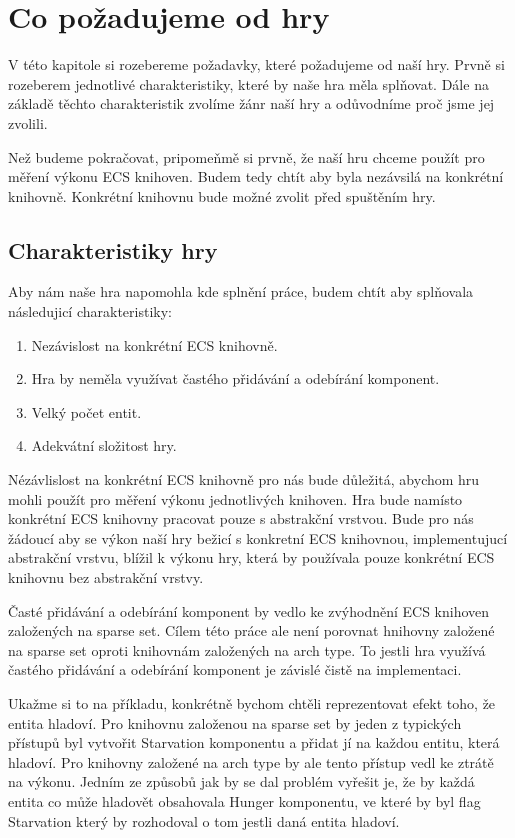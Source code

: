\chapter{Co požadujeme od hry}
V této kapitole si rozebereme požadavky, které požadujeme od naší hry. Prvně si rozeberem jednotlivé charakteristiky, které by naše hra měla splňovat. Dále na základě těchto charakteristik zvolíme žánr naší hry a odůvodníme proč jsme jej zvolili.

Než budeme pokračovat, pripomeňmě si prvně, že naší hru chceme použít pro měření výkonu ECS knihoven. Budem tedy chtít aby byla nezávsilá na konkrétní knihovně. Konkrétní knihovnu bude možné zvolit před spuštěním hry.

\section{Charakteristiky hry}
Aby nám naše hra napomohla kde splnění práce, budem chtít aby splňovala následujicí charakteristiky:

\begin{enumerate}
    \item Nezávislost na konkrétní ECS knihovně.
    \item Hra by neměla využívat častého přidávání a odebírání komponent.
    \item Velký počet entit.
    \item Adekvátní složitost hry.
\end{enumerate}

Nézávlislost na konkrétní ECS knihovně pro nás bude důležitá, abychom hru mohli použít pro měření výkonu jednotlivých knihoven. Hra bude namísto konkrétní ECS knihovny pracovat pouze s abstrakční vrstvou. Bude pro nás žádoucí aby se výkon naší hry bežicí s konkretní ECS knihovnou, implementujucí abstrakční vrstvu, blížil k výkonu hry, která by používala pouze konkrétní ECS knihovnu bez abstrakční vrstvy.

Časté přidávání a odebírání komponent by vedlo ke zvýhodnění ECS knihoven založených na sparse set. Cílem této práce ale není porovnat hnihovny založené na sparse set oproti knihovnám založených na arch type. To jestli hra využívá častého přidávání a odebírání komponent je závislé čistě na implementaci. 

Ukažme si to na příkladu, konkrétně bychom chtěli reprezentovat efekt toho, že entita hladoví. Pro knihovnu založenou na sparse set by jeden z typických přístupů byl vytvořit Starvation komponentu a přidat jí na každou entitu, která hladoví. Pro knihovny založené na arch type by ale tento přístup vedl ke ztrátě na výkonu. Jedním ze způsobů jak by se dal problém vyřešit je, že by každá entita co může hladovět obsahovala Hunger komponentu, ve které by byl flag Starvation který by rozhodoval o tom jestli daná entita hladoví.

